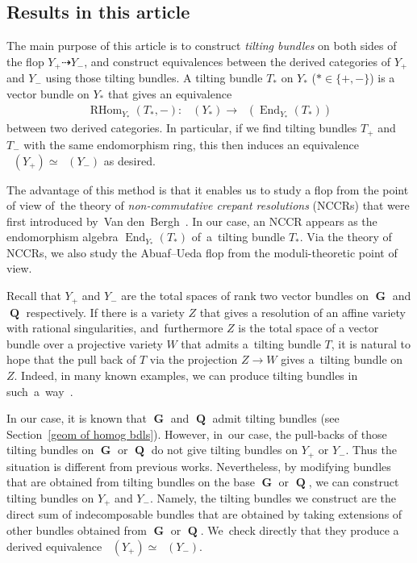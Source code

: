 \documentclass[10pt,a4paper]{amsart}
\DeclareMathOperator{\D}{D^b}
\DeclareMathOperator{\End}{End}
\DeclareMathOperator{\G}{\mathbf{G}}
\DeclareMathOperator{\Q}{\mathbf{Q}}
\DeclareMathOperator{\RHom}{RHom}
\numberwithin{equation}{section}
\begin{document}
\subsection{Results in this article}
The main purpose of this article is to construct \textit{tilting bundles} on both sides of the flop $Y_+ \dashrightarrow Y_-$,
and construct equivalences between the derived categories of $Y_+$ and $Y_-$ using those tilting bundles.
A tilting bundle $T_{\ast}$ on $Y_{\ast}$ ($\ast \in \{ +, - \}$) is a vector bundle on $Y_{\ast}$ that gives an equivalence
\begin{gather*}
\RHom_{Y_{\ast}}(T_{\ast}, -)\colon \ \D(Y_{\ast}) \to \D(\End_{Y_{\ast}}(T_{\ast}))
\end{gather*}
between two derived categories.
In particular, if we find tilting bundles $T_+$ and $T_-$ with the same endomorphism ring, this then induces an equivalence
$\D(Y_+) \simeq \D(Y_-)$ as desired.

The advantage of this method is that it enables us to study a flop
from the point of view of~the theory of \textit{non-commutative crepant resolutions} (NCCRs)
that were first introduced by~Van den~Bergh~\cite{VdB04b}.
In our case, an NCCR appears as the endomorphism algebra $\End_{Y_{\ast}}(T_{\ast})$ of~a~til\-ting bundle $T_{\ast}$.
Via the theory of NCCRs, we also study the Abuaf--Ueda flop from the moduli-theoretic point of view.

Recall that $Y_+$ and $Y_-$ are the total spaces of rank two vector bundles on $\G$ and $\Q$ respectively.
If there is a variety $Z$ that gives a resolution of an affine variety with rational singularities, and~furthermore
$Z$ is the total space of a vector bundle over a projective variety $W$ that admits a~tilting bundle $T$,
it is natural to hope that the pull back of $T$ via the projection $Z \to W$ gives a~tilting bundle on $Z$.
Indeed, in many known examples, we can produce tilting bundles in such~a~way~\cite{BLV10, H17a, WZ12}.

In our case, it is known that $\G$ and $\Q$ admit tilting bundles (see Section~\ref{geom of homog bdls}).
However, in~our case, the pull-backs of those tilting bundles on $\G$ or $\Q$ do not give tilting bundles on $Y_+$ or $Y_-$.
Thus the situation is different from previous works.
Nevertheless, by modifying bundles that are obtained from tilting bundles on the base $\G$ or $\Q$,
we can construct tilting bundles on $Y_+$ and $Y_-$.
Namely, the tilting bundles we construct are the direct sum of indecomposable bundles that are obtained by taking extensions of
other bundles obtained from $\G$ or $\Q$.
We~check directly that they produce a derived equivalence $\D(Y_+) \simeq \D(Y_-)$.
\end{document}
